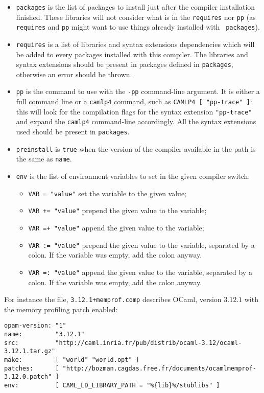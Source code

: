 \documentclass[a4paper,10pt]{article}
\begin{document}
\begin{itemize}
\item {\tt packages} is the list of packages to install just after the
  compiler installation finished. These libraries will not consider
  what is in the {\tt requires} nor {\tt pp} (as {\tt requires} and
  {\tt pp} might want to use things already installed with {\tt
    packages}).

\item {\tt requires} is a list of libraries and syntax extensions
  dependencies which will be added to every packages installed with
  this compiler. The libraries and syntax extensions should be present
  in packages defined in {\tt packages}, otherwise an error should be
  thrown.

\item {\tt pp} is the command to use with the {\tt -pp} command-line
  argument. It is either a full command line or a {\tt camlp4} command,
  such as \verb+CAMLP4 [ "pp-trace" ]+: this will look for the
  compilation flags for the syntax extension \verb+"pp-trace"+ and expand
  the {\tt camlp4} command-line accordingly. All the syntax extensions used
  should be present in {\tt packages}.

\item {\tt preinstall} is {\tt true} when the version of the compiler available
  in the path is the same as {\tt name}.

\item {\tt env} is the list of environment variables to set in the
  given compiler switch:
\begin{itemize}
\item {\tt VAR = "value"} set the variable to the given value;
\item {\tt VAR += "value"} prepend the given value to the variable;
\item {\tt VAR =+ "value"} append the given value to the variable;
\item {\tt VAR := "value"} prepend the given value to the variable,
  separated by a colon. If the variable was empty, add the
  colon anyway.
\item {\tt VAR =: "value"} append the given value to the variable,
  separated by a colon. If the variable was empty, add the colon
  anyway.
\end{itemize}
\end{itemize}

For instance the file, {\tt 3.12.1+memprof.comp} describes OCaml,
version $3.12.1$ with the memory profiling patch enabled:

\begin{verbatim}
opam-version: "1"
name:         "3.12.1"
src:          "http://caml.inria.fr/pub/distrib/ocaml-3.12/ocaml-3.12.1.tar.gz"
make:         [ "world" "world.opt" ]
patches:      [ "http://bozman.cagdas.free.fr/documents/ocamlmemprof-3.12.0.patch" ]
env:          [ CAML_LD_LIBRARY_PATH = "%{lib}%/stublibs" ]
\end{verbatim}
\end{document}
